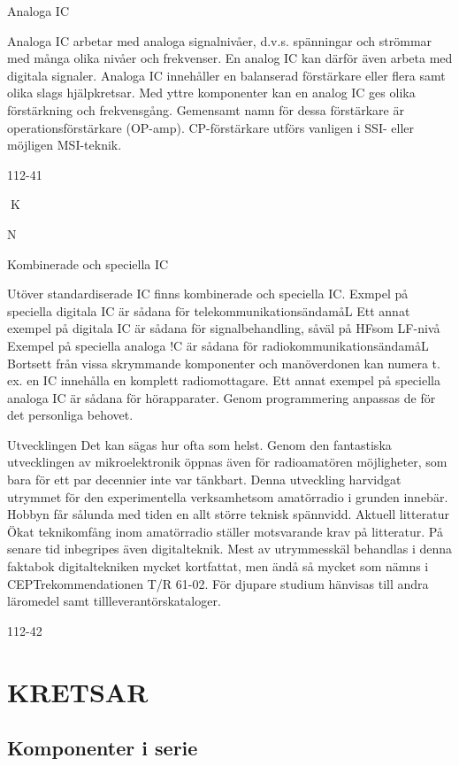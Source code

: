 \documentclass[a4paper,twoside,twocolumn,openright]{book}
\begin{document}
{{{{Analoga IC

Analoga IC arbetar med analoga signalnivåer, d.v.s. spänningar och strömmar med
många olika nivåer och frekvenser. En analog IC kan därför även arbeta med digitala
signaler.
Analoga IC innehåller en balanserad förstärkare eller flera samt olika slags hjälpkretsar. Med yttre komponenter kan en analog IC ges olika förstärkning och frekvensgång. Gemensamt namn för dessa förstärkare är operationsförstärkare (OP-amp).
CP-förstärkare utförs vanligen i SSI- eller
möjligen MSI-teknik.

112-41

K

N

Kombinerade och speciella IC

Utöver standardiserade IC finns kombinerade och speciella IC.
Exmpel på speciella digitala IC är sådana
för telekommunikationsändamåL
Ett annat exempel på digitala IC är sådana för signalbehandling, såväl på HFsom LF-nivå
Exempel på speciella analoga !C är sådana för radiokommunikationsändamåL
Bortsett från vissa skrymmande komponenter och manöverdonen kan numera t. ex. en
IC innehålla en komplett radiomottagare.
Ett annat exempel på speciella analoga
IC är sådana för hörapparater. Genom programmering anpassas de för det personliga
behovet.

Utvecklingen
Det kan sägas hur ofta som helst. Genom
den fantastiska utvecklingen av mikroelektronik öppnas även för radioamatören möjligheter, som bara för ett par decennier inte
var tänkbart.
Denna utveckling harvidgat utrymmet för
den experimentella verksamhetsom amatörradio i grunden innebär. Hobbyn får sålunda
med tiden en allt större teknisk spännvidd.
Aktuell litteratur
Ökat teknikomfång inom amatörradio ställer
motsvarande krav på litteratur. På senare tid
inbegripes även digitalteknik.
Mest av utrymmesskäl behandlas i denna
faktabok digitaltekniken mycket kortfattat,
men ändå så mycket som nämns i CEPTrekommendationen T/R 61-02. För djupare
studium hänvisas till andra läromedel samt
tillleverantörskataloger.

112-42


\chapter{KRETSAR}

\section{Komponenter i serie}

}}}}
\end{document}
